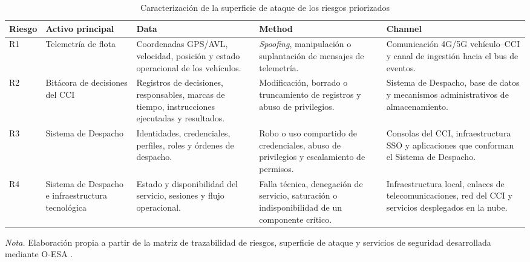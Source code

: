 \begin{table}[H]
	\centering
	\caption{Caracterización de la superficie de ataque de los riesgos priorizados}
	\label{tab:superficie_ataque}
	\scriptsize
	\begin{tabularx}{\textwidth}{
			>{\raggedright\arraybackslash}p{1.15cm}
			>{\raggedright\arraybackslash}p{2.7cm}
			>{\raggedright\arraybackslash}X
			>{\raggedright\arraybackslash}X
			>{\raggedright\arraybackslash}X}
		\toprule
		\textbf{Riesgo} &
		\textbf{Activo principal} &
		\textbf{Data} &
		\textbf{Method} &
		\textbf{Channel} \\
		\midrule
		
		R1 &
		Telemetría de flota &
		Coordenadas GPS/AVL, velocidad, posición y estado operacional de los vehículos. &
		\textit{Spoofing}, manipulación o suplantación de mensajes de telemetría. &
		Comunicación 4G/5G vehículo--CCI y canal de ingestión hacia el bus de eventos. \\
		
		\addlinespace
		
		R2 &
		Bitácora de decisiones del CCI &
		Registros de decisiones, responsables, marcas de tiempo, instrucciones ejecutadas y resultados. &
		Modificación, borrado o truncamiento de registros y abuso de privilegios. &
		Sistema de Despacho, base de datos y mecanismos administrativos de almacenamiento. \\
		
		\addlinespace
		
		R3 &
		Sistema de Despacho &
		Identidades, credenciales, perfiles, roles y órdenes de despacho. &
		Robo o uso compartido de credenciales, abuso de privilegios y escalamiento de permisos. &
		Consolas del CCI, infraestructura SSO y aplicaciones que conforman el Sistema de Despacho. \\
		
		\addlinespace
		
		R4 &
		Sistema de Despacho e infraestructura tecnológica &
		Estado y disponibilidad del servicio, sesiones y flujo operacional. &
		Falla técnica, denegación de servicio, saturación o indisponibilidad de un componente crítico. &
		Infraestructura local, enlaces de telecomunicaciones, red del CCI y servicios desplegados en la nube. \\
		
		\bottomrule
	\end{tabularx}
	
	\begin{minipage}{0.96\textwidth}
		\footnotesize
		\textit{Nota.} Elaboración propia a partir de la matriz de trazabilidad de riesgos,
		superficie de ataque y servicios de seguridad desarrollada mediante O-ESA \parencite{oesa2011,oesaCCI2026}.
	\end{minipage}
\end{table}

